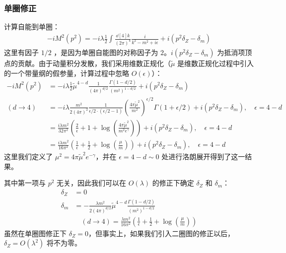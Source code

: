 \subsubsection{单圈修正}
计算自能到单圈：
\begin{equation}
\begin{aligned}
-iM^2(p^2)=-i\lambda \frac{1}{2}\int \frac{\dd[4]{k}}{(2\pi)^4} \frac{i}{k^2-m^2+i\epsilon} + i(p^2\delta_Z-\delta_m)
\end{aligned}
\end{equation}
这里有因子 $1/2$ ，是因为单圈自能图的对称因子为 $2$。$i(p^2\delta_Z-\delta_m)$ 为抵消项顶点的贡献。由于动量积分发散，我们采用维数正规化（$\tilde{\mu}$ 是维数正规化过程中引入的一个带量纲的假参量，计算过程中忽略 $O(\epsilon)$）：
\begin{equation}\label{phi4c1_eq2}
\begin{aligned}
-iM^2(p^2)&=-i\lambda \frac{1}{2} \tilde{\mu}^{4-d}\frac{1}{(4\pi)^{d/2}}\frac{\Gamma(1-d/2)}{(m^2)^{1-d/2}} + i(p^2\delta_Z-\delta_m)\\
(d\rightarrow 4)&= -i\lambda \frac{m^2}{2(4\pi)^2} \frac{1}{\epsilon/2\cdot(\epsilon/2-1)} \left(\frac{4\pi\tilde{\mu}^{2}}{m^2}\right)^{\epsilon/2}\Gamma(1+\epsilon/2) + i(p^2\delta_Z-\delta_m),\quad \epsilon=4-d\\
&=\frac{i\lambda m^2}{32\pi^2}\left(\frac{2}{\epsilon}+1+\log\left(\frac{4\pi\tilde{\mu}^2}{m^2e^{\gamma}}\right) \right)+ i(p^2\delta_Z-\delta_m),\quad \epsilon=4-d\\
&=\frac{i\lambda m^2}{16\pi^2}\left(\frac{1}{\epsilon}+\frac{1}{2}+\log\left(\frac{\mu}{m}\right) \right)+ i(p^2\delta_Z-\delta_m),\quad \epsilon=4-d
\end{aligned}
\end{equation}
这里我们定义了 $\mu^2=4\pi \tilde{\mu}^2 e^{-\gamma}$，并在 $\epsilon=4-d\sim 0$ 处进行洛朗展开得到了这一结果。

其中第一项与 $p^2$ 无关，因此我们可以在 $O(\lambda)$ 的修正下确定 $\delta_Z$ 和 $\delta_m$：
\begin{equation}
\begin{aligned}
\delta_Z &= 0\\
\delta_m &= -\frac{\lambda m^2}{2(4\pi)^{d/2}}\tilde{\mu}^{4-d} \frac{\Gamma(1-d/2)}{(m^2)^{1-d/2}}\\
&\quad (d\rightarrow 4)=\frac{\lambda m^2}{16\pi^2}\left(\frac{1}{\epsilon}+\frac{1}{2}+\log\left(\frac{\mu}{m}\right)\right)
\end{aligned}
\end{equation}
虽然在单圈图修正下 $\delta_Z=0$，但事实上，如果我们引入二圈图的修正以后，$\delta_Z=O(\lambda^2)$ 将不为零。

